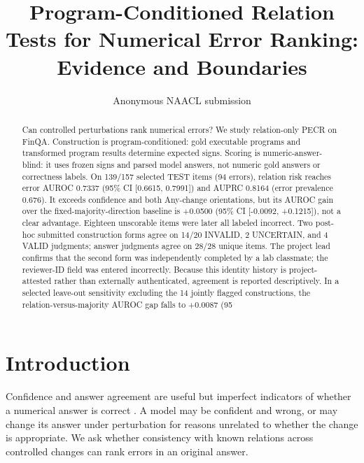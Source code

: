 \documentclass[11pt]{article}
\title{Program-Conditioned Relation Tests for Numerical Error Ranking: Evidence and Boundaries}
\author{Anonymous NAACL submission}
\begin{document}
\maketitle
\begin{abstract}
Can controlled perturbations rank numerical errors? We study relation-only PECR on FinQA. Construction is program-conditioned: gold executable programs and transformed program results determine expected signs. Scoring is numeric-answer-blind: it uses frozen signs and parsed model answers, not numeric gold answers or correctness labels. On 139/157 selected TEST items (94 errors), relation risk reaches error AUROC 0.7337 (95\% CI [0.6615, 0.7991]) and AUPRC 0.8164 (error prevalence 0.676). It exceeds confidence and both Any-change orientations, but its AUROC gain over the fixed-majority-direction baseline is +0.0500 (95\% CI [-0.0092, +0.1215]), not a clear advantage. Eighteen unscorable items were later all labeled incorrect. Two post-hoc submitted construction forms agree on 14/20 INVALID, 2 UNCERTAIN, and 4 VALID judgments; answer judgments agree on 28/28 unique items. The project lead confirms that the second form was independently completed by a lab classmate; the reviewer-ID field was entered incorrectly. Because this identity history is project-attested rather than externally authenticated, agreement is reported descriptively. In a selected leave-out sensitivity excluding the 14 jointly flagged constructions, the relation-versus-majority AUROC gap falls to +0.0087 (95%
\end{abstract}

\section{Introduction}
Confidence and answer agreement are useful but imperfect indicators of whether a numerical answer is correct \citep{guo-etal-2017-calibration,wang-etal-2022-self-consistency,kuhn-etal-2023-semantic-uncertainty}. A model may be confident and wrong, or may change its answer under perturbation for reasons unrelated to whether the change is appropriate. We ask whether consistency with known relations across controlled changes can rank errors in an original answer.
\end{document}
